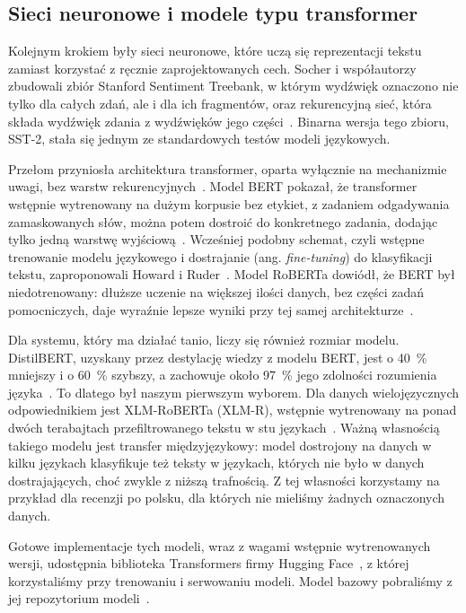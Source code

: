 \subsection{Sieci neuronowe i modele typu transformer}
\label{sec:sentiment-transformers}

Kolejnym krokiem były sieci neuronowe, które uczą się reprezentacji tekstu zamiast korzystać z ręcznie zaprojektowanych cech.
Socher i współautorzy zbudowali zbiór Stanford Sentiment Treebank, w którym wydźwięk oznaczono nie tylko dla całych zdań, ale i dla ich fragmentów, oraz rekurencyjną sieć, która składa wydźwięk zdania z wydźwięków jego części~\cite{socher2013recursive}.
Binarna wersja tego zbioru, SST-2, stała się jednym ze standardowych testów modeli językowych.

Przełom przyniosła architektura transformer, oparta wyłącznie na mechanizmie uwagi, bez warstw rekurencyjnych~\cite{vaswani2017attention}.
Model BERT pokazał, że transformer wstępnie wytrenowany na dużym korpusie bez etykiet, z zadaniem odgadywania zamaskowanych słów, można potem dostroić do konkretnego zadania, dodając tylko jedną warstwę wyjściową~\cite{devlin2019bert}.
Wcześniej podobny schemat, czyli wstępne trenowanie modelu językowego i dostrajanie (ang. \textit{fine-tuning}) do klasyfikacji tekstu, zaproponowali Howard i Ruder~\cite{howard2018universal}.
Model RoBERTa dowiódł, że BERT był niedotrenowany: dłuższe uczenie na większej ilości danych, bez części zadań pomocniczych, daje wyraźnie lepsze wyniki przy tej samej architekturze~\cite{liu2019roberta}.

Dla systemu, który ma działać tanio, liczy się również rozmiar modelu.
DistilBERT, uzyskany przez destylację wiedzy z modelu BERT, jest o \qty{40}{\percent} mniejszy i o \qty{60}{\percent} szybszy, a zachowuje około \qty{97}{\percent} jego zdolności rozumienia języka~\cite{sanh2019distilbert}.
To dlatego był naszym pierwszym wyborem.
Dla danych wielojęzycznych odpowiednikiem jest XLM-RoBERTa (XLM-R), wstępnie wytrenowany na ponad dwóch terabajtach przefiltrowanego tekstu w stu językach~\cite{conneau2020unsupervised}.
Ważną własnością takiego modelu jest transfer międzyjęzykowy: model dostrojony na danych w kilku językach klasyfikuje też teksty w językach, których nie było w danych dostrajających, choć zwykle z niższą trafnością.
Z tej własności korzystamy na przykład dla recenzji po polsku, dla których nie mieliśmy żadnych oznaczonych danych.

Gotowe implementacje tych modeli, wraz z wagami wstępnie wytrenowanych wersji, udostępnia biblioteka Transformers firmy Hugging Face~\cite{wolf2020transformers}, z której korzystaliśmy przy trenowaniu i serwowaniu modeli.
Model bazowy  pobraliśmy z jej repozytorium modeli~\cite{docxlmrbase}.

